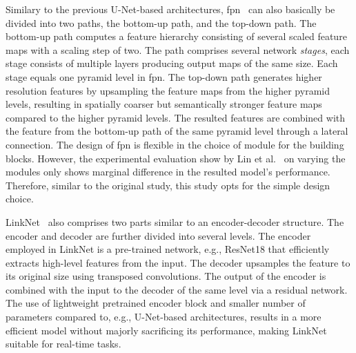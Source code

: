 \documentclass[mathematics,article,submit,pdftex,moreauthors]{Definitions/mdpi}
\begin{document}
Similary to the previous U-Net-based architectures,
\ac{fpn}~\cite{Lin2017} can also basically 
be divided into two paths, the bottom-up path,
and the top-down path. The bottom-up
path computes a feature hierarchy consisting
of several scaled feature maps with a scaling
step of two. The path comprises several network
\textit{stages}, each stage consists of multiple layers
producing output maps of the same size.
Each stage equals one pyramid level in \ac{fpn}.
The top-down path generates higher resolution
features by upsampling the feature maps from
the higher pyramid levels, resulting
in spatially coarser but semantically stronger feature maps
compared to the higher pyramid levels.
The resulted features are combined with
the feature from the bottom-up
path of the same pyramid level through a lateral
connection. The design of \ac{fpn}
is flexible in the choice of module
for the building blocks.
However, the experimental evaluation show by 
Lin et al.~\cite{Lin2017} on varying the modules only
shows marginal difference in the resulted model's
performance. Therefore, similar to the original study,
this study opts for the simple design choice.

LinkNet~\cite{Chaurasia2017} also comprises two parts similar
to an encoder-decoder structure. 
The encoder and decoder are further
divided into several levels.
The encoder employed in LinkNet is a pre-trained
network, e.g., ResNet18 that
efficiently extracts high-level features from
the input. The decoder upsamples the feature
to its original size using transposed
convolutions. The output of the
encoder is combined with the input
to the decoder of the same level via
a residual network. The use of lightweight
pretrained encoder block and smaller
number of parameters compared to, e.g., 
U-Net-based architectures, results 
in a more efficient model without
majorly sacrificing its performance,
making LinkNet suitable for real-time
tasks.
\end{document}
